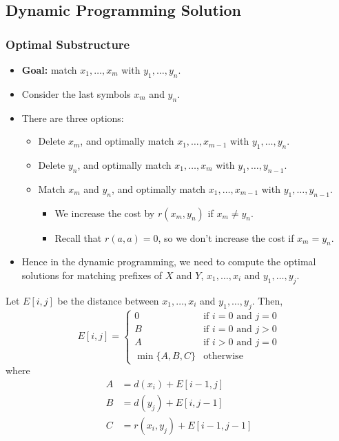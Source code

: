 \subsection{Dynamic Programming Solution}

\subsubsection{Optimal Substructure}

\begin{itemize}
    \item \textbf{Goal:} match $x_1, \dots, x_m$ with $y_1, \dots, y_n$.

    \item Consider the last symbols $x_m$ and $y_n$.

    \item There are three options:
    
    \begin{itemize}
        \item {\color{lightBlue}Delete} $x_m$, and optimally match $x_1, \dots, x_{m - 1}$ with $y_1, \dots, y_n$.
        \item {\color{lightBlue}Delete} $y_n$, and optimally match $x_1, \dots, x_m$ with $y_1, \dots, y_{n - 1}$.
        \item {\color{darkGreen}Match} $x_m$ and $y_n$, and optimally match $x_1, \dots, x_{m - 1}$ with $y_1, \dots, y_{n - 1}$.
        \begin{itemize}
            \item We increase the cost by $r(x_m, y_n)$ if $x_m \ne y_n$.
            \item Recall that $r(a, a) = 0$, so we don't increase the cost if $x_m = y_n$.
        \end{itemize}
    \end{itemize}

    \item Hence in the dynamic programming, we need to compute the optimal solutions for matching prefixes of $X$ and $Y$, $x_1, \dots, x_i$ and $y_1, \dots, y_j$.
\end{itemize}

Let $E[i, j]$ be the distance between $x_1, \dots, x_i$ and $y_1, \dots, y_j$. Then, \[
    E[i, j] = \begin{cases}
        0                 & \text{if } i = 0 \text{ and } j = 0 \\
        B                 & \text{if } i = 0 \text{ and } j > 0 \\
        A                 & \text{if } i > 0 \text{ and } j = 0 \\
        \min\{ A, B, C \} & \text{otherwise}
    \end{cases}
\] where \[
    \begin{aligned}
        A & = d(x_i) + E[i - 1, j]          \\
        B & = d(y_j) + E[i, j - 1]          \\
        C & = r(x_i, y_j) + E[i - 1, j - 1]
    \end{aligned}
\]

